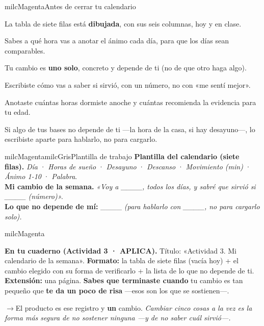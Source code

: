 \documentclass[11pt,letterpaper]{article}
\newcommand{\puente}[1]{%
  \begin{puentebox}%
    \textcolor{milcGradeDark}{$\rightarrow$}\hspace{2mm}#1%
  \end{puentebox}%
}
\begin{document}
\begin{drawbox}{milcMagenta}{Antes de cerrar tu calendario}
\begin{checklista}
\item La tabla de siete filas está \textbf{dibujada}, con sus seis columnas, hoy y en clase.
\item Sabes a qué hora vas a anotar el ánimo cada día, para que los días sean comparables.
\item Tu cambio es \textbf{uno solo}, concreto y depende de ti (no de que otro haga algo).
\item Escribiste cómo vas a saber si sirvió, con un número, no con «me sentí mejor».
\item Anotaste cuántas horas dormiste anoche y cuántas recomienda la evidencia para tu edad.
\item Si algo de tus bases no depende de ti ---la hora de la casa, si hay desayuno---, lo escribiste aparte para hablarlo, no para cargarlo.
\end{checklista}
\end{drawbox}

\begin{softbox}{milcMagenta}{milcGris}{Plantilla de trabajo}
\textbf{Plantilla del calendario (siete filas).} \emph{Día} · \emph{Horas de sueño} · \emph{Desayuno} · \emph{Descanso} · \emph{Movimiento (min)} · \emph{Ánimo 1-10} · \emph{Palabra}. \\[1mm]
\textbf{Mi cambio de la semana.} \emph{«Voy a \_\_\_\_, todos los días, y sabré que sirvió si \_\_\_\_ (número)».} \\[1mm]
\textbf{Lo que no depende de mí:} \_\_\_\_ \emph{(para hablarlo con \_\_\_\_, no para cargarlo solo).}
\end{softbox}

\begin{infoband}{milcMagenta}


\textbf{En tu cuaderno (Actividad 3 · APLICA).} Título: «Actividad 3. Mi calendario de la semana». \textbf{Formato:} la tabla de siete filas (vacía hoy) + el cambio elegido con su forma de verificarlo + la lista de lo que no depende de ti. \textbf{Extensión:} una página. \textbf{Sabes que terminaste cuando} tu cambio es tan pequeño que \textbf{te da un poco de risa} ---esos son los que se sostienen---.
\end{infoband}

\puente{El producto es ese registro y \textbf{un} cambio. \emph{Cambiar cinco cosas a la vez es la forma más segura de no sostener ninguna ---y de no saber cuál sirvió---.}}
\end{document}
